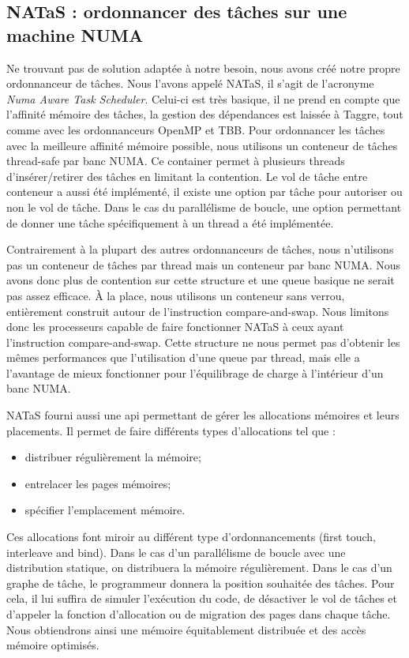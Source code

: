 \subsection{NATaS : ordonnancer des tâches sur une machine NUMA}
Ne trouvant pas de solution adaptée à notre besoin, nous avons créé notre propre ordonnanceur de tâches.
%
Nous l'avons appelé NATaS, il s'agit de l'acronyme {\em Numa Aware Task Scheduler}.
%
Celui-ci est très basique, il ne prend en compte que l'affinité mémoire des tâches, la gestion des dépendances est laissée à Taggre, tout comme avec les ordonnanceurs OpenMP et TBB.
%
Pour ordonnancer les tâches avec la meilleure affinité mémoire possible, nous utilisons un conteneur de tâches thread-safe par banc NUMA.
%
Ce container permet à plusieurs threads d'insérer/retirer des tâches en limitant la contention.
%
Le vol de tâche entre conteneur a aussi été implémenté, il existe une option par tâche pour autoriser ou non le vol de tâche.
%
Dans le cas du parallélisme de boucle, une option permettant de donner une tâche spécifiquement à un thread a été implémentée.


Contrairement à la plupart des autres ordonnanceurs de tâches, nous n'utilisons pas un conteneur de tâches par thread mais un conteneur par banc NUMA.
%
Nous avons donc plus de contention sur cette structure et une queue basique ne serait pas assez efficace.
%
\`A la place, nous utilisons un conteneur sans verrou, entièrement construit autour de l'instruction compare-and-swap.
%
Nous limitons donc les processeurs capable de faire fonctionner NATaS à ceux ayant l'instruction compare-and-swap.
%
Cette structure ne nous permet pas d'obtenir les mêmes performances que l'utilisation d'une queue par thread, mais elle a l'avantage de mieux fonctionner pour l'équilibrage de charge à l'intérieur d'un banc NUMA.



NATaS fourni aussi une api permettant de gérer les allocations mémoires et leurs placements.
%
Il permet de faire différents types d'allocations tel que :
\begin{itemize}
  \item distribuer régulièrement la mémoire;
  \item entrelacer les pages mémoires;
  \item spécifier l'emplacement mémoire.
\end{itemize}
%
Ces allocations font miroir au différent type d'ordonnancements (first touch, interleave and bind).
%
Dans le cas d'un parallélisme de boucle avec une distribution statique, on distribuera la mémoire régulièrement.
%
Dans le cas d'un graphe de tâche, le programmeur donnera la position souhaitée des tâches.
%
Pour cela, il lui suffira de simuler l'exécution du code, de désactiver le vol de tâches et d'appeler la fonction d'allocation ou de migration des pages dans chaque tâche.
%
Nous obtiendrons ainsi une mémoire équitablement distribuée et des accès mémoire optimisés.


